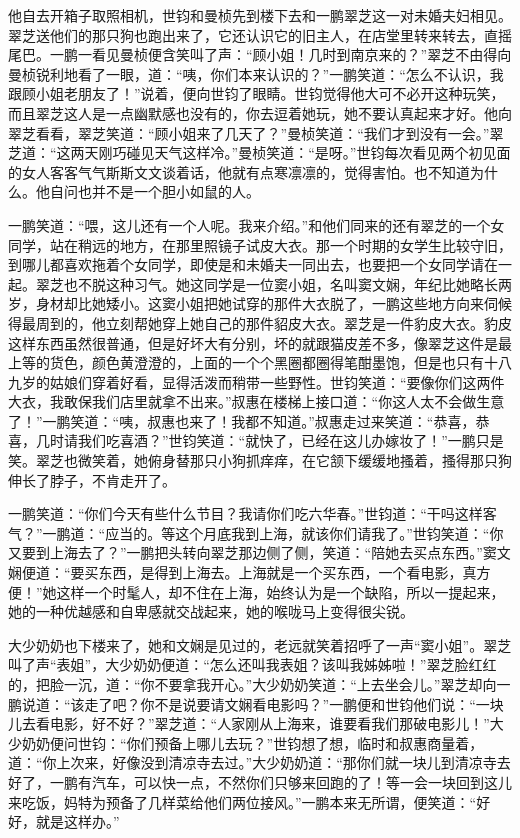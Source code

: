 \par 他自去开箱子取照相机，世钧和曼桢先到楼下去和一鹏翠芝这一对未婚夫妇相见。翠芝送他们的那只狗也跑出来了，它还认识它的旧主人，在店堂里转来转去，直摇尾巴。一鹏一看见曼桢便含笑叫了声：“顾小姐！几时到南京来的？”翠芝不由得向曼桢锐利地看了一眼，道：“咦，你们本来认识的？”一鹏笑道：“怎么不认识，我跟顾小姐老朋友了！”说着，便向世钧了眼睛。世钧觉得他大可不必开这种玩笑，而且翠芝这人是一点幽默感也没有的，你去逗着她玩，她不要认真起来才好。他向翠芝看看，翠芝笑道：“顾小姐来了几天了？”曼桢笑道：“我们才到没有一会。”翠芝道：“这两天刚巧碰见天气这样冷。”曼桢笑道：“是呀。”世钧每次看见两个初见面的女人客客气气斯斯文文谈着话，他就有点寒凛凛的，觉得害怕。也不知道为什么。他自问也并不是一个胆小如鼠的人。
\par 一鹏笑道：“喂，这儿还有一个人呢。我来介绍。”和他们同来的还有翠芝的一个女同学，站在稍远的地方，在那里照镜子试皮大衣。那一个时期的女学生比较守旧，到哪儿都喜欢拖着个女同学，即使是和未婚夫一同出去，也要把一个女同学请在一起。翠芝也不脱这种习气。她这同学是一位窦小姐，名叫窦文娴，年纪比她略长两岁，身材却比她矮小。这窦小姐把她试穿的那件大衣脱了，一鹏这些地方向来伺候得最周到的，他立刻帮她穿上她自己的那件貂皮大衣。翠芝是一件豹皮大衣。豹皮这样东西虽然很普通，但是好坏大有分别，坏的就跟猫皮差不多，像翠芝这件是最上等的货色，颜色黄澄澄的，上面的一个个黑圈都圈得笔酣墨饱，但是也只有十八九岁的姑娘们穿着好看，显得活泼而稍带一些野性。世钧笑道：“要像你们这两件大衣，我敢保我们店里就拿不出来。”叔惠在楼梯上接口道：“你这人太不会做生意了！”一鹏笑道：“咦，叔惠也来了！我都不知道。”叔惠走过来笑道：“恭喜，恭喜，几时请我们吃喜酒？”世钧笑道：“就快了，已经在这儿办嫁妆了！”一鹏只是笑。翠芝也微笑着，她俯身替那只小狗抓痒痒，在它颔下缓缓地搔着，搔得那只狗伸长了脖子，不肯走开了。
\par 一鹏笑道：“你们今天有些什么节目？我请你们吃六华春。”世钧道：“干吗这样客气？”一鹏道：“应当的。等这个月底我到上海，就该你们请我了。”世钧笑道：“你又要到上海去了？”一鹏把头转向翠芝那边侧了侧，笑道：“陪她去买点东西。”窦文娴便道：“要买东西，是得到上海去。上海就是一个买东西，一个看电影，真方便！”她这样一个时髦人，却不住在上海，始终认为是一个缺陷，所以一提起来，她的一种优越感和自卑感就交战起来，她的喉咙马上变得很尖锐。
\par 大少奶奶也下楼来了，她和文娴是见过的，老远就笑着招呼了一声“窦小姐”。翠芝叫了声“表姐”，大少奶奶便道：“怎么还叫我表姐？该叫我姊姊啦！”翠芝脸红红的，把脸一沉，道：“你不要拿我开心。”大少奶奶笑道：“上去坐会儿。”翠芝却向一鹏说道：“该走了吧？你不是说要请文娴看电影吗？”一鹏便和世钧他们说：“一块儿去看电影，好不好？”翠芝道：“人家刚从上海来，谁要看我们那破电影儿！”大少奶奶便问世钧：“你们预备上哪儿去玩？”世钧想了想，临时和叔惠商量着，道：“你上次来，好像没到清凉寺去过。”大少奶奶道：“那你们就一块儿到清凉寺去好了，一鹏有汽车，可以快一点，不然你们只够来回跑的了！等一会一块回到这儿来吃饭，妈特为预备了几样菜给他们两位接风。”一鹏本来无所谓，便笑道：“好好，就是这样办。”
